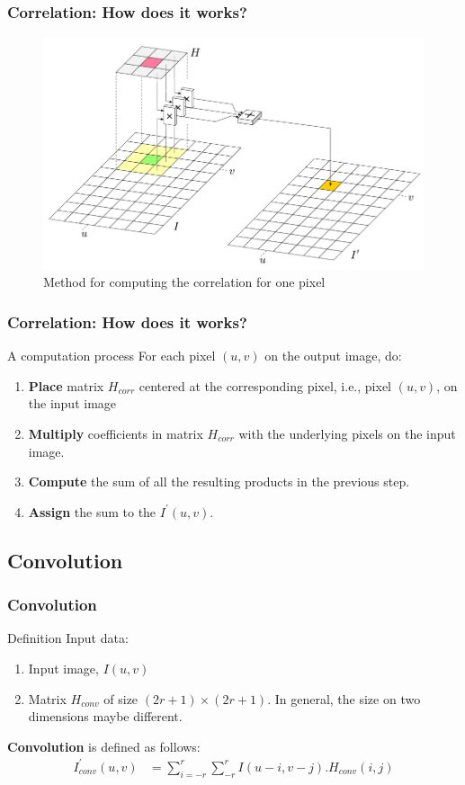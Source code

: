 \documentclass[english,11pt,table,handout]{beamer}
\begin{document}
\frame
{
	\frametitle{Correlation: How does it works?}
	\begin{figure}[!h]
		\includegraphics[scale=0.57]{correlation.png}
		\caption{Method for computing the correlation for one pixel}
	\end{figure}
}

\frame
{
	\frametitle{Correlation: How does it works?}
	\begin{block}{A computation process}
		For each pixel $(u,v)$ on the output image, do:
		\begin{enumerate}
			\item \textbf{Place} matrix $H_{corr}$ centered at the corresponding pixel, i.e., pixel $(u,v)$, on the input image
			\item \textbf{Multiply} coefficients in matrix $H_{corr}$ with the underlying pixels on the input image.
			\item \textbf{Compute} the sum of all the resulting products in the previous step.
			\item \textbf{Assign} the sum to the $I^{'}(u,v)$.
		\end{enumerate}
	
	\end{block}
}


\subsection{Convolution}
\frame
{
	\frametitle{Convolution}
		
	\begin{block}{Definition}
		Input data:
		\begin{enumerate}
			\item Input image, $I(u,v)$
			\item Matrix $H_{conv}$ of size $(2r+1) \times (2r+1)$. In general, the size on two dimensions maybe different.
		\end{enumerate}
		\textbf{Convolution} is defined as follows:
		\begin{equation*} 
		\begin{split}
		I_{conv}^{'}{(u,v)} &= \sum_{i=-r}^{r}{\sum_{-r}^{r}{I(u-i, v-j).H_{conv}{(i,j)}}}
		\end{split}
		\end{equation*}
	\end{block}
}
\end{document}
